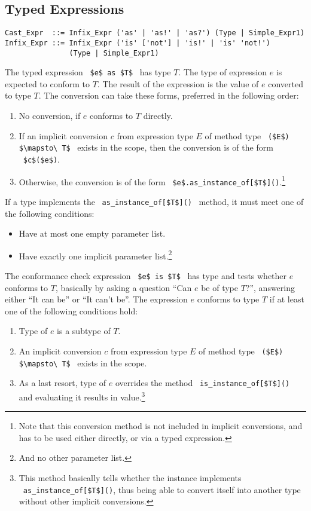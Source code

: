 \subsection{Typed Expressions}
\label{sec:typed-expressions}

\syntax\begin{lstlisting}
Cast_Expr  ::= Infix_Expr ('as' | 'as!' | 'as?') (Type | Simple_Expr1)
Infix_Expr ::= Infix_Expr ('is' ['not'] | 'is!' | 'is' 'not!') 
               (Type | Simple_Expr1)
\end{lstlisting}

The typed expression ~\lstinline!$e$ as $T$!~ has type $T$. The type of expression $e$ is expected to conform to $T$. The result of the expression is the value of $e$ converted to type $T$. The conversion can take these forms, preferred in the following order:
\begin{enumerate}
  \item No conversion, if $e$ conforms to $T$ directly. 
  \item If an implicit conversion $c$ from expression type $E$ of method type ~\lstinline!($E$) $\mapsto\ T$!~ exists in the scope, then the conversion is of the form ~\lstinline!$c$($e$)!. 
  \item Otherwise, the conversion is of the form ~\lstinline!$e$.as_instance_of[$T$]()!.\footnote{Note that this conversion method is not included in implicit conversions, and has to be used either directly, or via a typed expression.}
\end{enumerate}

If a type implements the ~\lstinline!as_instance_of[$T$]()!~ method, it must meet one of the following conditions:
\begin{itemize}
  \item Have at most one empty parameter list.
  \item Have exactly one implicit parameter list.\footnote{And no other parameter list.}
\end{itemize}

The conformance check expression ~\lstinline!$e$ is $T$!~ has type  and tests whether $e$ conforms to $T$, basically by asking a question ``Can $e$ be of type $T$?'', answering either ``It can be'' or ``It can't be''. The expression $e$ conforms to type $T$ if at least one of the following conditions hold:
\begin{enumerate}
  \item Type of $e$ is a subtype of $T$. 
  \item An implicit conversion $c$ from expression type $E$ of method type ~\lstinline!($E$) $\mapsto\ T$!~ exists in the scope. 
  \item As a last resort, type of $e$ overrides the method ~\lstinline!is_instance_of[$T$]()!~ and evaluating it results in  value.\footnote{This method basically tells whether the instance implements ~\lstinline!as_instance_of[$T$]()!, thus being able to convert itself into another type without other implicit conversions.}
\end{enumerate}

